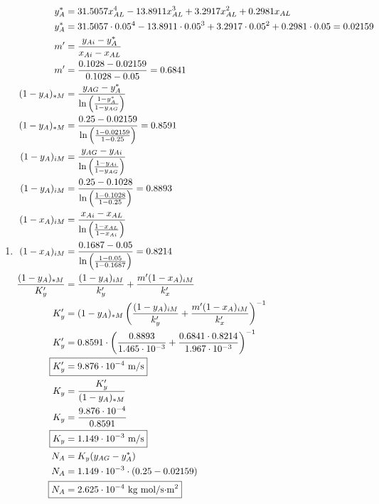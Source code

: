 \documentclass[12pt]{article}
\begin{document}
\begin{enumerate}
\begin{enumerate}
        \item 
        \begin{align*}
            y_A^* &= 31.5057 x_{AL}^4 - 13.8911 x_{AL}^3 + 3.2917 x_{AL}^2 + 0.2981 x_{AL} \\ 
            y_A^* &= 31.5057 \cdot 0.05^4 - 13.8911 \cdot 0.05^3 + 3.2917 \cdot 0.05^2 + 0.2981 \cdot 0.05 = 0.02159 \\
            m' &= \frac{y_{Ai} - y_A^*}{x_{Ai} - x_{AL}} \\
            m' &= \frac{0.1028 - 0.02159}{0.1028 - 0.05} = 0.6841\\
            (1 - y_A)_{*M} &= \frac{y_{AG} - y_A^*}{\ln\left(\frac{1 - y_A^*}{1 - y_{AG}}\right)} \\
            (1 - y_A)_{*M} &= \frac{0.25 - 0.02159}{\ln\left(\frac{1 - 0.02159}{1 - 0.25}\right)} = 0.8591 \\ 
            (1 - y_{A})_{iM} &= \frac{y_{AG} - y_{Ai}}{\ln\left(\frac{1 - y_{Ai}}{1 - y_{AG}}\right)} \\ 
            (1 - y_{A})_{iM} &= \frac{0.25 - 0.1028}{\ln\left(\frac{1 - 0.1028}{1 - 0.25}\right)} = 0.8893 \\ 
            (1 - x_{A})_{iM} &= \frac{x_{Ai} - x_{AL}}{\ln\left(\frac{1 - x_{AL}}{1 - x_{Ai}}\right)} \\
            (1 - x_{A})_{iM} &= \frac{0.1687 - 0.05}{\ln\left(\frac{1 - 0.05}{1 - 0.1687}\right)} = 0.8214 \\
            \frac{(1 - y_A)_{*M}}{K_y'} &= \frac{(1 - y_{A})_{iM}}{k_y'} + \frac{m' (1 - x_{A})_{iM}}{k_x'} \\
            K_y' &= (1 - y_A)_{*M} \left(\frac{(1 - y_{A})_{iM}}{k_y'} + \frac{m' (1 - x_{A})_{iM}}{k_x'}\right)^{-1} \\
            K_y' &= 0.8591 \cdot \left(\frac{0.8893}{1.465 \cdot 10^{-3}} + \frac{0.6841 \cdot 0.8214}{1.967 \cdot 10^{-3}}\right)^{-1} \\
            \Aboxed{K_y' &= 9.876 \cdot 10^{-4} \text{ m/s}} \\
            K_y &= \frac{K_y'}{(1 - y_A)_{*M}} \\
            K_y &= \frac{9.876 \cdot 10^{-4}}{0.8591} \\
            \Aboxed{K_y &= 1.149 \cdot 10^{-3} \text{ m/s}} \\
            N_A &= K_y (y_{AG} - y_A^*) \\
            N_A &= 1.149 \cdot 10^{-3} \cdot (0.25 - 0.02159) \\
            \Aboxed{N_A &= 2.625 \cdot 10^{-4} \text{ kg mol/s$\cdot$m$^2$}}
        \end{align*}


\end{enumerate}
\end{enumerate}
\end{document}
